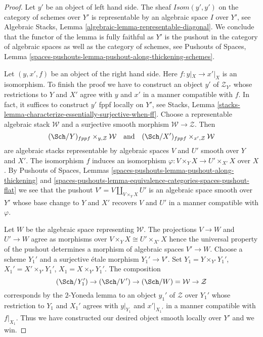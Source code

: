 \begin{proof}
Let $y'$ be an object of left hand side. The sheaf
$\mathit{Isom}(y', y')$ on the category of schemes over $Y'$
is representable by an algebraic space $I$ over $Y'$, see
Algebraic Stacks, Lemma \ref{algebraic-lemma-representable-diagonal}.
We conclude that the functor of the lemma is fully faithful as
$Y'$ is the pushout in the category of algebraic spaces as
well as the category of schemes, see
Pushouts of Spaces, Lemma
\ref{spaces-pushouts-lemma-pushout-along-thickening-schemes}.

\medskip\noindent
Let $(y, x', f)$ be an object of the right hand side. Here $f : y|_X \to x'|_X$
is an isomorphism. To finish the proof we have to construct an object $y'$ of
$\mathcal{Z}_{Y'}$ whose restrictions to $Y$ and $X'$ agree with $y$ and $x'$
in a manner compatible with $f$. In fact, it suffices to construct $y'$
fppf locally on $Y'$, see
Stacks, Lemma \ref{stacks-lemma-characterize-essentially-surjective-when-ff}.
Choose a representable algebraic stack
$\mathcal{W}$ and a surjective smooth morphism $\mathcal{W} \to \mathcal{Z}$.
Then
$$
(\Sch/Y)_{fppf} \times_{y, \mathcal{Z}} \mathcal{W}
\quad\text{and}\quad
(\Sch/X')_{fppf} \times_{x', \mathcal{Z}} \mathcal{W}
$$
are algebraic stacks representable by algebraic spaces $V$ and $U'$
smooth over $Y$ and $X'$. The isomorphism $f$ induces an isomorphism
$\varphi : V \times_Y X \to U' \times_{X'} X$ over $X$. By
Pushouts of Spaces, Lemmas
\ref{spaces-pushouts-lemma-pushout-along-thickening} and
\ref{spaces-pushouts-lemma-equivalence-categories-spaces-pushout-flat}
we see that the pushout $V' = V \amalg_{V \times_Y X} U'$ is
an algebraic space smooth over $Y'$ whose base change to
$Y$ and $X'$ recovers $V$ and $U'$ in a manner compatible with $\varphi$.

\medskip\noindent
Let $W$ be the algebraic space representing $\mathcal{W}$.
The projections $V \to W$ and $U' \to W$ agree as morphisms
over $V \times_Y X \cong U' \times_{X'} X$ hence the universal
property of the pushout determines a morphism of algebraic spaces
$V' \to W$. Choose a scheme $Y_1'$ and a surjective \'etale morphism
$Y_1' \to V'$. Set $Y_1 = Y \times_{Y'} Y_1'$,
$X_1' = X' \times_{Y'} Y_1'$, $X_1 = X \times_{Y'} Y_1'$.
The composition
$$
(\Sch/Y_1') \to (\Sch/V') \to (\Sch/W) = \mathcal{W} \to \mathcal{Z}
$$
corresponds by the $2$-Yoneda lemma to an object $y_1'$ of $\mathcal{Z}$
over $Y_1'$ whose restriction to $Y_1$ and $X_1'$ agrees with $y|_{Y_1}$
and $x'|_{X_1'}$ in a manner compatible with $f|_{X_1}$. Thus we have
constructed our desired object smooth locally over $Y'$ and we win.
\end{proof}









